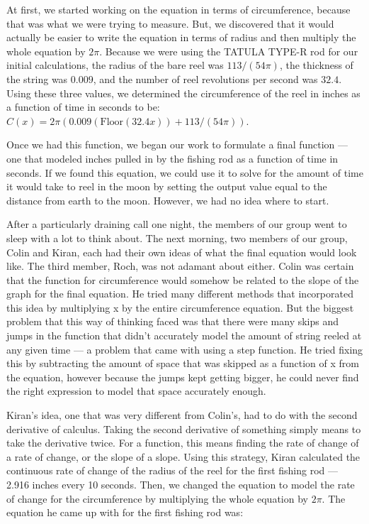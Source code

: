 At first, we started working on the equation in terms of circumference, because that was what we were trying to measure. But, we discovered that it would actually be easier to write the equation in terms of radius and then multiply the whole equation by $2\pi$. Because we were using the TATULA TYPE-R rod for our initial calculations, the radius of the bare reel was $113/(54\pi)$, the thickness of the string was $0.009$, and the number of reel revolutions per second was $32.4$. Using these three values, we determined the circumference of the reel in inches as a function of time in seconds to be: $C(x)=2\pi (0.009(\text{Floor}(32.4x))+113/(54\pi))$.

Once we had this function, we began our work to formulate a final function — one that modeled inches pulled in by the fishing rod as a function of time in seconds. If we found this equation, we could use it to solve for the amount of time it would take to reel in the moon by setting the output value equal to the distance from earth to the moon. However, we had no idea where to start.

After a particularly draining call one night, the members of our group went to sleep with a lot to think about. The next morning, two members of our group, Colin and Kiran, each had their own ideas of what the final equation would look like. The third member, Roch, was not adamant about either. Colin was certain that the function for circumference would somehow be related to the slope of the graph for the final equation. He tried many different methods that incorporated this idea by multiplying x by the entire circumference equation. But the biggest problem that this way of thinking faced was that there were many skips and jumps in the function that didn’t accurately model the amount of string reeled at any given time — a problem that came with using a step function. He tried fixing this by subtracting the amount of space that was skipped as a function of x from the equation, however because the jumps kept getting bigger, he could never find the right expression to model that space accurately enough.

Kiran’s idea, one that was very different from Colin’s, had to do with the second derivative of calculus. Taking the second derivative of something simply means to take the derivative twice. For a function, this means finding the rate of change of a rate of change, or the slope of a slope. Using this strategy, Kiran calculated the continuous rate of change of the radius of the reel for the first fishing rod — 2.916 inches every 10 seconds. Then, we changed the equation to model the rate of change for the circumference by multiplying the whole equation by $2\pi$. The equation he came up with for the first fishing rod was:

